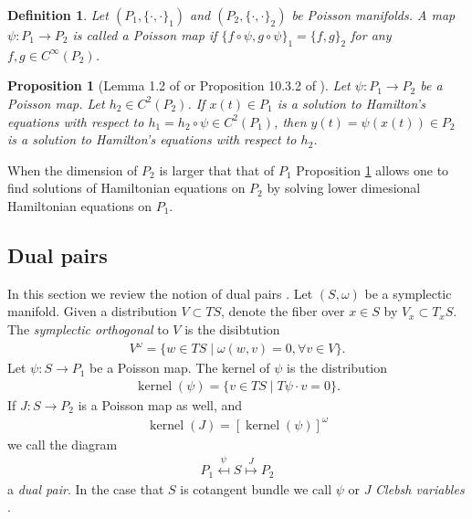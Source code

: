 \documentclass[12pt]{amsart}
\newtheorem{prop}[thm]{Proposition}
\newtheorem{defn}[thm]{Definition}
\DeclareMathOperator{\kernel}{kernel}
\begin{document}
\begin{defn}
  Let $(P_1, \{ \cdot , \cdot \}_1)$ and $(P_2, \{ \cdot , \cdot \}_2)$
  be Poisson manifolds.
  A map $\psi:P_1 \to P_2$ is called a
  \emph{Poisson map} if $\{ f \circ \psi , g \circ \psi \}_1 = \{ f , g \}_2$  for any $f,g \in C^{\infty}(P_2)$.
\end{defn}


\begin{prop}[Lemma 1.2 of \cite{Weinstein1983} or Proposition 10.3.2 of \cite{MandS}] \label{prop:Poisson_dynamics}
  Let $\psi:P_1 \to P_2$ be a Poisson map.
  Let $h_2 \in C^2(P_2)$.
  If $x(t) \in P_1$ is a solution to Hamilton's equations with respect
  to $h_1 = h_2 \circ \psi \in C^2(P_1)$, then $y(t) = \psi(x(t)) \in P_2$ is a solution
  to Hamilton's equations with respect to $h_2$.
\end{prop}

  When the dimension of $P_2$ is larger that that of $P_1$
  Proposition \ref{prop:Poisson_dynamics} allows one to find solutions of
  Hamiltonian equations on $P_2$
  by solving lower dimesional Hamiltonian equations
  on $P_1$.
  \subsection{Dual pairs}
  In this section we review the notion of dual pairs
  \cite{MarsdenWeinstein1983,Weinstein1983,Gay-BalmazVizman2011}.
  Let $(S,\omega)$ be a symplectic manifold.
  Given a distribution $V \subset TS$, denote the fiber over 
  $x \in S$ by $V_x \subset T_x S$.
  The \emph{symplectic orthogonal} to $V$ is the disibtution
  \begin{align*}
    V^\omega = \{ w \in TS \mid \omega( w , v ) = 0, \forall v \in V \}.
  \end{align*}
  Let $\psi:S \to P_1$ be a Poisson map.
  The kernel of $\psi$ is the distribution
  \begin{align*}
    \kernel(\psi) = \{ v \in TS \mid T\psi \cdot v  = 0 \}.
  \end{align*}
  If $J:S \to P_2$ is a Poisson map as well, and
  \begin{align*}
    \kernel(J) =  [\kernel(\psi) ]^\omega
  \end{align*}
  we call the diagram
  \begin{align*}
    P_1 \stackrel{\psi}{\mapsfrom} S \stackrel{J}{\mapsto} P_2
  \end{align*}
  a \emph{dual pair}.
  In the case that $S$ is cotangent bundle we call $\psi$ or $J$
  \emph{Clebsh variables} \cite{MarsdenWeinstein1983}.
\end{document}
